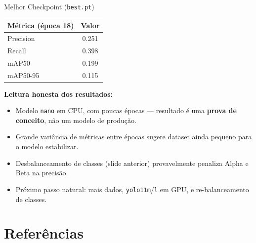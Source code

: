 \documentclass[aspectratio=169]{beamer}
\begin{document}
\begin{frame}{Melhor Checkpoint (\texttt{best.pt})}
  \begin{table}
    \begin{tabular}{l c}
      \toprule
      \textbf{Métrica (época 18)} & \textbf{Valor} \\
      \midrule
      Precision & 0.251 \\
      Recall & 0.398 \\
      mAP50 & 0.199 \\
      mAP50-95 & 0.115 \\
      \bottomrule
    \end{tabular}
  \end{table}
  \vspace{0.3cm}
  \textbf{Leitura honesta dos resultados:}
  \begin{itemize}
    \small
    \item Modelo \texttt{nano} em CPU, com poucas épocas — resultado é uma \textbf{prova de conceito}, não um modelo de produção.
    \item Grande variância de métricas entre épocas sugere dataset ainda pequeno para o modelo estabilizar.
    \item Desbalanceamento de classes (slide anterior) provavelmente penaliza Alpha e Beta na precisão.
    \item Próximo passo natural: mais dados, \texttt{yolo11m}/\texttt{l} em GPU, e re-balanceamento de classes.
  \end{itemize}
\end{frame}

\section{Referências}
\end{document}
